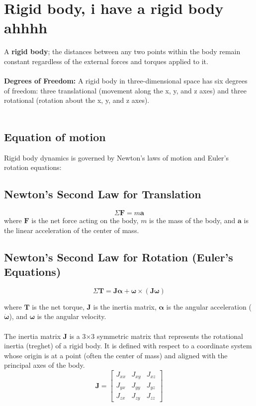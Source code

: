 \section{Rigid body, i have a rigid body ahhhh}
A \textbf{rigid body}; the distances between any two points within the body remain constant regardless of the external forces and torques applied to it.
\\
\\

\textbf{Degrees of Freedom:} A rigid body in three-dimensional space has six degrees of freedom: three translational (movement along the x, y, and z axes) and three rotational (rotation about the x, y, and z axes).
\\
\\
\subsection{Equation of motion}

Rigid body dynamics is governed by Newton's laws of motion and Euler's rotation equations:

\subsection{Newton’s Second Law for Translation}

\begin{equation}
\Sigma\mathbf{F} = m \mathbf{a}
\end{equation}
where 
\(\mathbf{F}\) is the net force acting on the body, 
\(m\) is the mass of the body, and 
\(\mathbf{a}\) is the linear acceleration of the center of mass.

\subsection{Newton’s Second Law for Rotation (Euler’s Equations)}

\begin{equation}
\Sigma\mathbf{T} = \mathbf{J} \boldsymbol{\alpha} + \boldsymbol{\omega} \times (\mathbf{J} \boldsymbol{\omega})
\end{equation}

where 
\(\mathbf{T}\) is the net torque, 
\(\mathbf{J}\) is the inertia matrix, 
\(\boldsymbol{\alpha}\) is the angular acceleration (\(\boldsymbol{\Dot{\omega}}\)), and 
\(\boldsymbol{\omega}\) is the angular velocity.
\\
\\




The inertia matrix \textbf{J} is a 3×3 symmetric matrix that represents the rotational inertia (treghet) of a rigid body. It is defined with respect to a coordinate system whose origin is at a point (often the center of mass) and aligned with the principal axes of the body.
\[
\mathbf{J} = \begin{bmatrix}
    J_{xx} & J_{xy} & J_{xz} \\
    J_{yx} & J_{yy} & J_{yz} \\
    J_{zx} & J_{zy} & J_{zz}
\end{bmatrix}
\]
